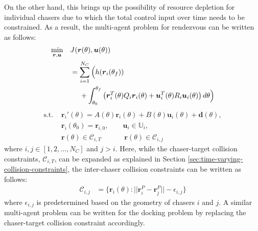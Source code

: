On the other hand, this brings up the possibility of resource depletion for individual chasers due to which the total control input over time needs to be constrained.
As a result, the multi-agent problem for rendezvous can be written as follows:
\begin{align}
    \min_{\boldsymbol{r}, \boldsymbol{u}}\quad &J(\boldsymbol{r}(\theta),\boldsymbol{u}(\theta))\\
    & =\sum_{i=1}^{N_C}\Big(h(\boldsymbol{r}_i(\theta_f))\notag\\
    & \quad\ +\int_{\theta_0}^{\theta_f}\left(\boldsymbol{r}_i^T(\theta)Q_i\boldsymbol{r}_i(\theta)+\boldsymbol{u}_i^T(\theta)R_i\boldsymbol{u}_i(\theta)\right)d\theta\Big)\notag
\end{align}
\begin{subequations}
\begin{align}
    \textrm{s.t. } & \boldsymbol{r}_i'(\theta)=A(\theta)\boldsymbol{r}_i(\theta)+B(\theta)\boldsymbol{u}_i(\theta)+\boldsymbol{d}(\theta),\\
    & \boldsymbol{r}_i(\theta_0)={\boldsymbol{r}}_{i,0},\quad\quad\boldsymbol{u}_i\in{\mathbb{U}}_i,\\
    & \boldsymbol{r}(\theta)\in{\mathcal{C}}_{i,T}\qquad\quad\ \boldsymbol{r}(\theta)\in{\mathcal{C}}_{i,j}\label{eqn:multi-agent-rendezvous}
\end{align}
\end{subequations}
where $i,j\in[1,2,\ldots,N_C]$ and $j>i$.
Here, while the chaser-target collision constraints, ${\mathcal{C}}_{i,T}$, can be expanded as explained in Section \ref{sec:time-varying-collision-constraints}, the inter-chaser collision constraints can be written as follows:
\begin{align}
    {\mathcal{C}}_{i,j}&=\{\boldsymbol{r}_i(\theta):||\boldsymbol{r}^P_{i}-\boldsymbol{r}^P_{j}||-\epsilon_{i,j}\}
\end{align}
where $\epsilon_{i,j}$ is predetermined based on the geometry of chasers $i$ and $j$. A similar multi-agent problem can be written for the docking problem by replacing the chaser-target collision constraint accordingly.


